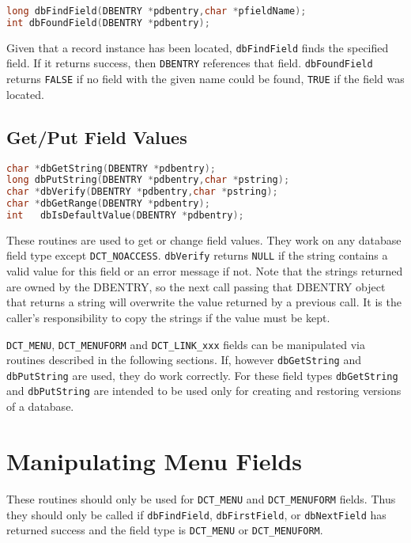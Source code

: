 \begin{lstlisting}[language=C]
long dbFindField(DBENTRY *pdbentry,char *pfieldName);
int dbFoundField(DBENTRY *pdbentry);

\end{lstlisting}

Given that a record instance has been located, \verb|dbFindField| finds the specified field.
If it returns success, then \verb|DBENTRY| references that field.
\verb|dbFoundField| returns \verb|FALSE| if no field with the given name could be found, \verb|TRUE| if the field was located.

\subsection{Get/Put Field Values}

\begin{lstlisting}[language=C]
char *dbGetString(DBENTRY *pdbentry);
long dbPutString(DBENTRY *pdbentry,char *pstring);
char *dbVerify(DBENTRY *pdbentry,char *pstring);
char *dbGetRange(DBENTRY *pdbentry);
int   dbIsDefaultValue(DBENTRY *pdbentry);
\end{lstlisting}

These routines are used to get or change field values.
They work on any database field type except \verb|DCT_NOACCESS|.
\verb|dbVerify| returns \verb|NULL| if the string contains a valid value for this field or an error message if not.
Note that the strings returned are owned by the DBENTRY, so the next call passing that DBENTRY object that returns a string will overwrite the value returned by a previous call.
It is the caller's responsibility to copy the strings if the value must be kept.

\verb|DCT_MENU|, \verb|DCT_MENUFORM| and \verb|DCT_LINK_xxx| fields can be manipulated via routines described in the following sections.
If, however \verb|dbGetString| and \verb|dbPutString| are used, they do work correctly.
For these field types \verb|dbGetString| and \verb|dbPutString| are intended to be used only for creating and restoring versions of a database.

\section{Manipulating Menu Fields}

These routines should only be used for \verb|DCT_MENU| and \verb|DCT_MENUFORM| fields.
Thus they should only be called if \verb|dbFindField|, \verb|dbFirstField|, or \verb|dbNextField| has returned success and the field type is \verb|DCT_MENU| or \verb|DCT_MENUFORM|.

